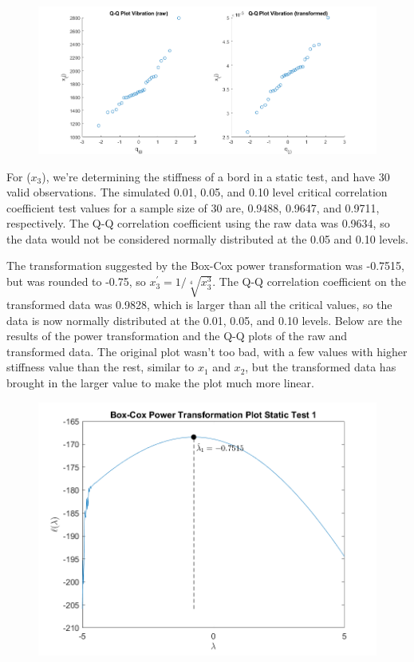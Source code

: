 \begin{center}
    \begin{figure}[H]
        \centering
        \includegraphics[scale=0.4]{./matlab/chapter-4/sol4.33.qq.2.png}
    \end{figure}
\end{center}

For ($x_{3}$), we're determining the stiffness of a bord in a static test, and have 30 valid observations. The simulated 0.01, 0.05, and 0.10 level critical correlation coefficient test values for a sample size of 30 are, 0.9488, 0.9647, and 0.9711, respectively. The Q-Q correlation coefficient using the raw data was 0.9634, so the data would not be considered normally distributed at the 0.05 and 0.10 levels.

The transformation suggested by the Box-Cox power transformation was -0.7515, but was rounded to -0.75, so $x_{3}^{\prime} = 1/\sqrt[4]{x_{3}^{3}}$. The Q-Q correlation coefficient on the transformed data was 0.9828, which is larger than all the critical values, so the data is now normally distributed at the 0.01, 0.05, and 0.10 levels. Below are the results of the power transformation and the Q-Q plots of the raw and transformed data. The original plot wasn't too bad, with a few values with higher stiffness value than the rest, similar to $x_{1}$ and $x_{2}$, but the transformed data has brought in the larger value to make the plot much more linear.

\begin{center}
    \begin{figure}[H]
        \centering
        \includegraphics[scale=0.6]{./matlab/chapter-4/sol4.33.power.3.png}
    \end{figure}
\end{center}

